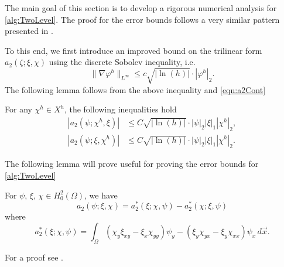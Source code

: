 The main goal of this section is to develop a rigorous numerical analysis for
\autoref{alg:TwoLevel}. The proof for the error bounds follows a very similar pattern presented in
\cite{Fairag98}.

To this end, we first introduce an improved bound on the trilinear form $a_2(\zeta; \xi, \chi)$ using
the discrete Sobolev inequality, i.e.
\begin{equation*}
  \|\nabla \varphi^h\|_{L^{\infty}} \le c \sqrt{|\ln(h)|}\cdot |\varphi^h|_2.
\end{equation*}
The following lemma follows from the above inequality and \eqref{eqn:a2Cont} %
\begin{lemma} \label{lma:bImproved}
  For any $\chi^h\in X^h$, the following inequalities hold
  \begin{align*}
    |a_2(\psi;\chi^h,\xi)| &\le C\sqrt{|\ln(h)|} \cdot |\psi|_2 |\xi|_1 |\chi^h|_2, \\
    |a_2(\psi;\xi,\chi^h)| &\le C\sqrt{|\ln(h)|} \cdot |\psi|_2 |\xi|_1 |\chi^h|_2.
  \end{align*}
\end{lemma}
The following lemma will prove useful for proving the error bounds for \autoref{alg:TwoLevel}
\begin{lemma} \label{lma:trilinear}
  For $\psi,\,\xi,\,\chi\in H^2_0(\Omega)$, we have
  \begin{equation}
    a_2(\psi; \xi, \chi) = a_2^*(\xi; \chi, \psi) - a_2^*(\chi; \xi, \psi)
    \label{eqn:eqn:trilinear}
  \end{equation}
  where
  \begin{equation}
    a_2^*(\xi; \chi, \psi) = \int_{\Omega}\! (\chi_y\xi_{xy}-\xi_x\chi_{yy}) \psi_y -
    (\xi_y\chi_{yx}-\xi_y\chi_{xx}) \psi_x \,d\vec{x}.
    \label{eqn:trilinear}
  \end{equation}
\end{lemma}
For a proof see \cite{Fairag98}.

